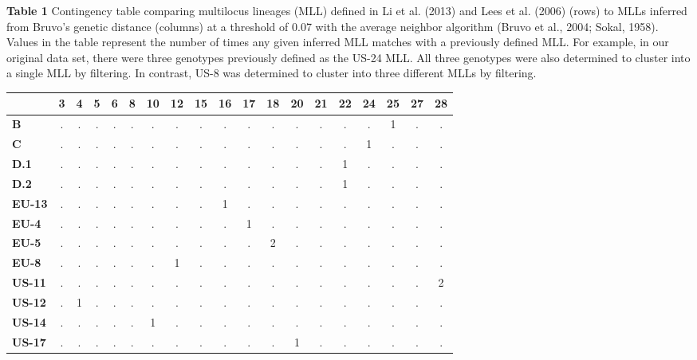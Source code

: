 \documentclass{frontiersSCNS} %
\begin{document}
\textbf{Table 1} Contingency table comparing multilocus lineages (MLL)
defined in Li et al. (2013) and Lees et al. (2006) (rows) to MLLs
inferred from Bruvo's genetic distance (columns) at a threshold of 0.07
with the average neighbor algorithm (Bruvo et al., 2004; Sokal, 1958).
Values in the table represent the number of times any given inferred MLL
matches with a previously defined MLL. For example, in our original data
set, there were three genotypes previously defined as the US-24 MLL. All
three genotypes were also determined to cluster into a single MLL by
filtering. In contrast, US-8 was determined to cluster into three
different MLLs by filtering.

\begin{table}[ht]
\centering
\begin{tabular}{l|cccccccccccccccccc}
  & \textbf{3} & \textbf{4} & \textbf{5} & \textbf{6} & \textbf{8} & \textbf{10} & \textbf{12} & \textbf{15} & \textbf{16} & \textbf{17} & \textbf{18} & \textbf{20} & \textbf{21} & \textbf{22} & \textbf{24} & \textbf{25} & \textbf{27} & \textbf{28} \\ 
  \hline
\textbf{B} & . & . & . & . & . & . & . & . & . & . & . & . & . & . & . & 1 & . & . \\ 
  \textbf{C} & . & . & . & . & . & . & . & . & . & . & . & . & . & . & 1 & . & . & . \\ 
  \textbf{D.1} & . & . & . & . & . & . & . & . & . & . & . & . & . & 1 & . & . & . & . \\ 
  \textbf{D.2} & . & . & . & . & . & . & . & . & . & . & . & . & . & 1 & . & . & . & . \\ 
  \textbf{EU-13} & . & . & . & . & . & . & . & . & 1 & . & . & . & . & . & . & . & . & . \\ 
  \textbf{EU-4} & . & . & . & . & . & . & . & . & . & 1 & . & . & . & . & . & . & . & . \\ 
  \textbf{EU-5} & . & . & . & . & . & . & . & . & . & . & 2 & . & . & . & . & . & . & . \\ 
  \textbf{EU-8} & . & . & . & . & . & . & 1 & . & . & . & . & . & . & . & . & . & . & . \\ 
  \textbf{US-11} & . & . & . & . & . & . & . & . & . & . & . & . & . & . & . & . & . & 2 \\ 
  \textbf{US-12} & . & 1 & . & . & . & . & . & . & . & . & . & . & . & . & . & . & . & . \\ 
  \textbf{US-14} & . & . & . & . & . & 1 & . & . & . & . & . & . & . & . & . & . & . & . \\ 
  \textbf{US-17} & . & . & . & . & . & . & . & . & . & . & . & 1 & . & . & . & . & . & . \\ 

\end{tabular}
\end{table}
\end{document}
